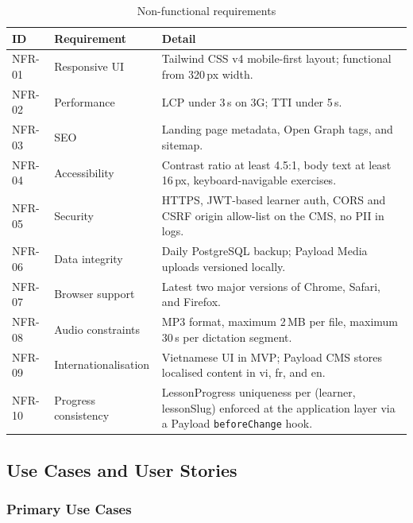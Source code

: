 \begin{table}[H]
\centering
\begin{tabularx}{\linewidth}{l X X}
\toprule
ID & Requirement & Detail \\
\midrule
NFR-01 & Responsive UI & Tailwind CSS v4 mobile-first layout; functional from 320\,px width. \\
NFR-02 & Performance & LCP under 3\,s on 3G; TTI under 5\,s. \\
NFR-03 & SEO & Landing page metadata, Open Graph tags, and sitemap. \\
NFR-04 & Accessibility & Contrast ratio at least 4.5:1, body text at least 16\,px, keyboard-navigable exercises. \\
NFR-05 & Security & HTTPS, JWT-based learner auth, CORS and CSRF origin allow-list on the CMS, no PII in logs. \\
NFR-06 & Data integrity & Daily PostgreSQL backup; Payload Media uploads versioned locally. \\
NFR-07 & Browser support & Latest two major versions of Chrome, Safari, and Firefox. \\
NFR-08 & Audio constraints & MP3 format, maximum 2\,MB per file, maximum 30\,s per dictation segment. \\
NFR-09 & Internationalisation & Vietnamese UI in MVP; Payload CMS stores localised content in vi, fr, and en. \\
NFR-10 & Progress consistency & LessonProgress uniqueness per (learner, lessonSlug) enforced at the application layer via a Payload \texttt{beforeChange} hook. \\
\bottomrule
\end{tabularx}
\caption{Non-functional requirements}
\end{table}

\subsection{Use Cases and User Stories}

\subsubsection{Primary Use Cases}

